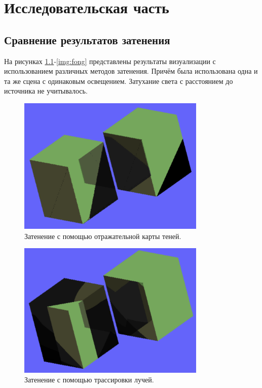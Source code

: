\chapter{Исследовательская часть}

\section{Сравнение результатов затенения}
На рисунках \ref{img:rsm}-\ref{img:fong} представлены результаты
визуализации с использованием различных методов затенения.
Причём была использована одна и та же сцена с одинаковым освещением.
Затухание света с расстоянием до источника не учитывалось.

\begin{figure}[H]
	\centering
	\includegraphics[width=0.8\textwidth]{img/rsm.png}
	\caption{Затенение с помощью отражательной карты теней.}
	\label{img:rsm}
\end{figure}

\begin{figure}[H]
	\centering
	\includegraphics[width=0.8\textwidth]{img/tracing.png}
	\caption{Затенение с помощью трассировки лучей.}
	\label{img:tracing}
\end{figure}

